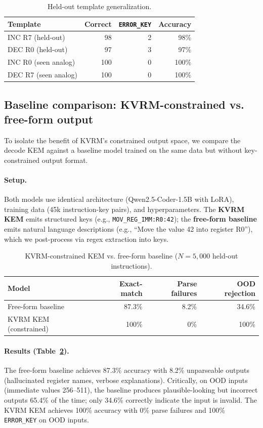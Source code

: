 \documentclass[11pt]{article}
\begin{document}
\begin{table}[h]
\centering
\caption{Held-out template generalization.}
\label{tab:heldout_templates}
\begin{tabular}{lrrr}
\toprule
Template & Correct & \texttt{ERROR\_KEY} & Accuracy \\
\midrule
INC R7 (held-out) & 98 & 2 & 98\% \\
DEC R0 (held-out) & 97 & 3 & 97\% \\
INC R0 (seen analog) & 100 & 0 & 100\% \\
DEC R7 (seen analog) & 100 & 0 & 100\% \\
\bottomrule
\end{tabular}
\end{table}

\subsection{Baseline comparison: KVRM-constrained vs. free-form output}
To isolate the benefit of KVRM's constrained output space, we compare the decode KEM against a baseline model trained on the same data but without key-constrained output format.

\paragraph{Setup.}
Both models use identical architecture (Qwen2.5-Coder-1.5B with LoRA), training data (45k instruction-key pairs), and hyperparameters.
The \textbf{KVRM KEM} emits structured keys (e.g., \texttt{MOV\_REG\_IMM:R0:42}); the \textbf{free-form baseline} emits natural language descriptions (e.g., ``Move the value 42 into register R0''), which we post-process via regex extraction into keys.

\begin{table}[h]
\centering
\caption{KVRM-constrained KEM vs. free-form baseline ($N{=}5{,}000$ held-out instructions).}
\label{tab:kvrm_vs_freeform}
\begin{tabular}{lrrr}
\toprule
Model & Exact-match & Parse failures & OOD rejection \\
\midrule
Free-form baseline & 87.3\% & 8.2\% & 34.6\% \\
KVRM KEM (constrained) & 100\% & 0\% & 100\% \\
\bottomrule
\end{tabular}
\end{table}

\paragraph{Results (Table~\ref{tab:kvrm_vs_freeform}).}
The free-form baseline achieves 87.3\% accuracy with 8.2\% unparseable outputs (hallucinated register names, verbose explanations).
Critically, on OOD inputs (immediate values 256--511), the baseline produces plausible-looking but incorrect outputs 65.4\% of the time; only 34.6\% correctly indicate the input is invalid.
The KVRM KEM achieves 100\% accuracy with 0\% parse failures and 100\% \texttt{ERROR\_KEY} on OOD inputs.
\end{document}
